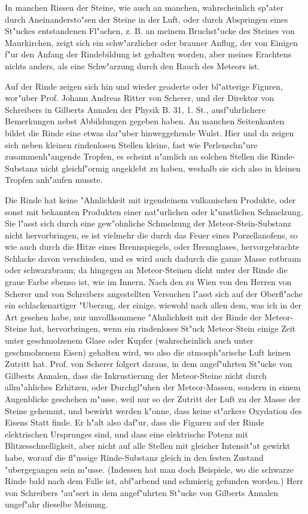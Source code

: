 \documentclass[a4paper, 11pt, oneside, polutonikogreek, german]{article}
\begin{document}
In manchen Rissen der Steine, wie auch an manchen, wahrscheinlich sp"ater durch Aneinandersto"sen der Steine in der Luft, oder durch Abspringen eines St"uckes entstandenen Fl"achen, z. B. an meinem Bruchst"ucke des Steines von Maurkirchen, zeigt sich ein schw"arzlicher oder brauner Anflug, der von Einigen f"ur den Anfang der Rindebildung ist gehalten worden, aber meines Erachtens nichts anders, als eine Schw"arzung durch den Rauch des Meteors ist.

Auf der Rinde zeigen sich hin und wieder geaderte oder bl"atterige Figuren, wor"uber Prof. Johann Andreas Ritter von Scherer, und der Direktor von Schreibers in Gilberts Annalen der Physik B. 31, 1. St., ausf"uhrlichere Bemerkungen nebst Abbildungen gegeben haben. An manchen Seitenkanten bildet die Rinde eine etwas dar"uber hinweggehende Wulst. Hier und da zeigen sich neben kleinen rindenlosen Stellen kleine, fast wie Perlenschn"ure zusammenh"angende Tropfen, es scheint n"amlich an solchen Stellen die Rinde-Substanz nicht gleichf"ormig angeklebt zu haben, weshalb sie sich also in kleinen Tropfen anh"aufen musste.

Die Rinde hat keine "Ahnlichkeit mit irgendeinem vulkanischen Produkte, oder sonst mit bekannten Produkten einer nat"urlichen oder k"unstlichen Schmelzung. Sie l"asst sich durch eine gew"ohnliche Schmelzung der Meteor-Stein-Substanz nicht hervorbringen, es ist vielmehr die durch das Feuer eines Porzellanofens, so wie auch durch die Hitze eines Brennspiegels, oder Brennglases, hervorgebrachte Schlacke davon verschieden, und es wird auch dadurch die ganze Masse rotbraun oder schwarzbraun; da hingegen an Meteor-Steinen dicht unter der Rinde die graue Farbe ebenso ist, wie im Innern. Nach den zu Wien von den Herren von Scherer und von Schreibers angestellten Versuchen l"asst sich auf der Oberfl"ache ein schlackenartiger "Uberzug, der einige, wiewohl nach allen dem, was ich in der Art gesehen habe, nur unvollkommene "Ahnlichkeit mit der Rinde der Meteor-Steine hat, hervorbringen, wenn ein rindenloses St"uck Meteor-Stein einige Zeit unter geschmolzenem Glase oder Kupfer (wahrscheinlich auch unter geschmolzenem Eisen) gehalten wird, wo also die atmosph"arische Luft keinen Zutritt hat. Prof. von Scherer folgert daraus, in dem angef"uhrten St"ucke von Gilberts Annalen, dass die Inkrustierung der Meteor-Steine nicht durch allm"ahliches Erhitzen, oder Durchgl"uhen der Meteor-Massen, sondern in einem Augenblicke geschehen m"usse, weil nur so der Zutritt der Luft zu der Masse der Steine gehemmt, und bewirkt werden k"onne, dass keine st"arkere Oxydation des Eisens Statt finde. Er h"alt also daf"ur, dass die Figuren auf der Rinde elektrischen Ursprunges sind, und dass eine elektrische Potenz mit Blitzesschnelligkeit, aber nicht auf alle Stellen mit gleicher Intensit"at gewirkt habe, worauf die fl"ussige Rinde-Substanz gleich in den festen Zustand "ubergegangen sein m"usse. (Indessen hat man doch Beispiele, wo die schwarze Rinde bald nach dem Falle ist, abf"arbend und schmierig gefunden worden.) Herr von Schreibers "au"sert in dem angef"uhrten St"ucke von Gilberts Annalen ungef"ahr dieselbe Meinung.
\end{document}
